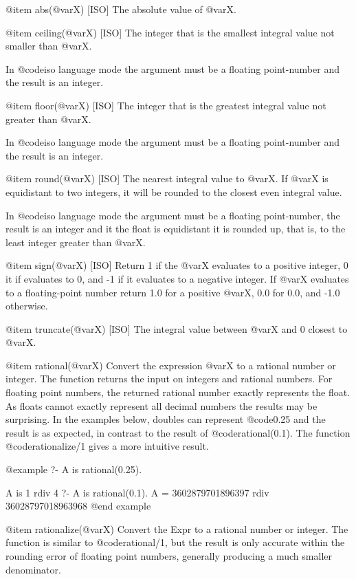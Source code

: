 {{{{@item abs(@var{X}) [ISO]
The absolute value of @var{X}.

@item ceiling(@var{X}) [ISO]
The integer that is the smallest integral value not smaller than @var{X}.

In @code{iso} language mode the argument must be a floating
point-number and the result is an integer.

@item floor(@var{X}) [ISO]
The integer that is the greatest integral value not greater than @var{X}.

In @code{iso} language mode the argument must be a floating
point-number and the result is an integer.

@item round(@var{X}) [ISO]
The nearest integral value to @var{X}. If @var{X} is
equidistant to two integers, it will be rounded to the closest even
integral value.

In @code{iso} language mode the argument must be a floating
point-number, the result is an integer and it the float is equidistant
it is rounded up, that is, to the least integer greater than @var{X}.

@item sign(@var{X}) [ISO]
Return 1 if the @var{X} evaluates to a positive integer, 0 it if
evaluates to 0, and -1 if it evaluates to a negative integer. If @var{X}
evaluates to a floating-point number return 1.0 for a positive @var{X},
0.0 for 0.0, and -1.0 otherwise.

@item truncate(@var{X}) [ISO]
The integral value between @var{X} and 0 closest to
@var{X}.

@item rational(@var{X})
Convert the expression @var{X} to a rational number or integer. The
function returns the input on integers and rational numbers. For
floating point numbers, the returned rational number exactly represents
the float. As floats cannot exactly represent all decimal numbers the
results may be surprising. In the examples below, doubles can represent
@code{0.25} and the result is as expected, in contrast to the result of
@code{rational(0.1)}. The function @code{rationalize/1} gives a more
intuitive result.

@example
?- A is rational(0.25).

A is 1 rdiv 4
?- A is rational(0.1).
A = 3602879701896397 rdiv 36028797018963968
@end example

@item rationalize(@var{X})
Convert the Expr to a rational number or integer. The function is
similar to @code{rational/1}, but the result is only accurate within the
rounding error of floating point numbers, generally producing a much
smaller denominator. 

}}}}
